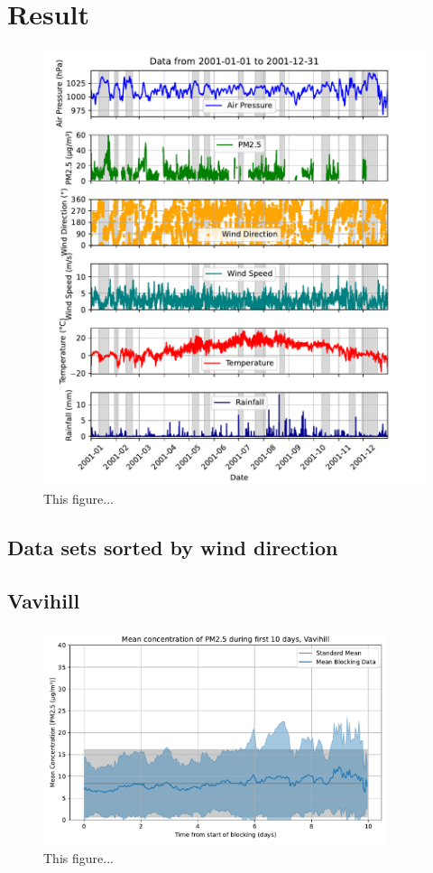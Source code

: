 \section{Result}

\begin{figure}[H]
    \centering    \includegraphics[width=1\textwidth]{Figures/plot_20010101_20011231.pdf}
    \caption{This figure...}
    \label{fig:example}
\end{figure}

\subsection{Data sets sorted by wind direction}

\subsection{Vavihill}
\begin{figure}[H]
    \centering    \includegraphics[width=0.9\textwidth]{Figures/Meanplot_Vavihill.pdf}
    \caption{This figure...}
    \label{fig:Meanplot_Vavihill}
\end{figure}

